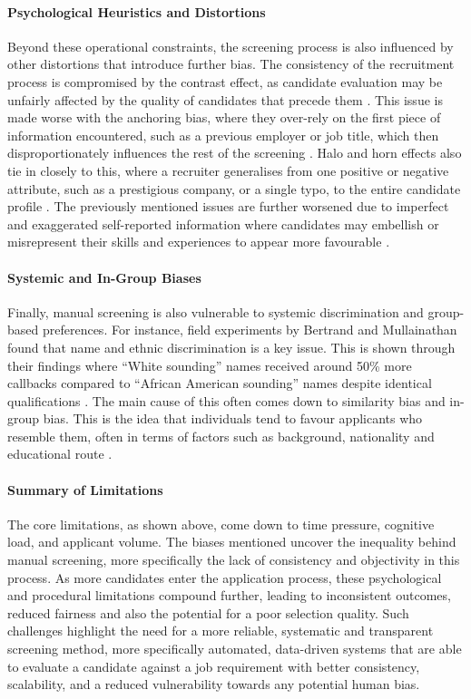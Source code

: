 \paragraph{Psychological Heuristics and Distortions}
Beyond these operational constraints, the screening process is also influenced by 
other distortions that introduce further bias.
The consistency of the recruitment process is compromised by the contrast effect, as 
candidate evaluation may be unfairly affected by the quality of candidates that precede 
them \cite{palmer2014}.
This issue is made worse with the anchoring bias, where they over-rely on the first 
piece of information encountered, such as a previous employer or job title, which then 
disproportionately influences the rest of the screening \cite{buijsrogge2021}.
Halo and horn effects also tie in closely to this, where a recruiter generalises from 
one positive or negative attribute, such as a prestigious company, or a single typo, to 
the entire candidate profile \cite{thorndike1920}.
The previously mentioned issues are further worsened due to imperfect and exaggerated 
self-reported information where candidates may embellish or misrepresent their skills and 
experiences to appear more favourable \cite{dunning2004}.

\paragraph{Systemic and In-Group Biases}
Finally, manual screening is also vulnerable to systemic discrimination and group-based preferences.
For instance, field experiments by Bertrand and Mullainathan found that name 
and ethnic discrimination is a key issue.
This is shown through their findings where “White sounding” names received around 
50\% more callbacks compared to “African American sounding” names despite identical qualifications \cite{bertrand2004}.
The main cause of this often comes down to similarity bias and in-group bias. This is the idea that
individuals tend to favour applicants who resemble them, often in terms of factors such as background, nationality
and educational route \cite{tajfel1986}.


\paragraph{Summary of Limitations}
The core limitations, as shown above, come down to time pressure, cognitive load, and applicant volume. 
The biases mentioned uncover the inequality behind manual screening, more specifically the lack of consistency
and objectivity in this process.
As more candidates enter the application process, these psychological and procedural 
limitations compound further, leading to inconsistent outcomes, reduced fairness and 
also the potential for a poor selection quality.
Such challenges highlight the need for a more reliable, systematic and transparent 
screening method, more specifically automated, data-driven systems that are able to 
evaluate a candidate against a job requirement with better consistency, scalability, 
and a reduced vulnerability towards any potential human bias.
